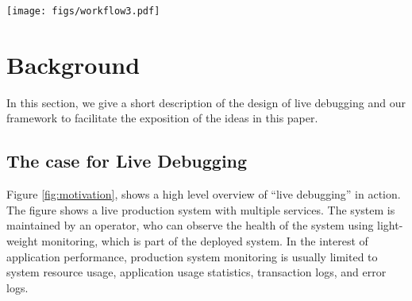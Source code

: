 
\begin{figure*}[ht!]
	\begin{center}
		\texttt{[image: figs/workflow3.pdf]}
		\caption{Workflow of \parikshan in a live multi-tier production system with several interacting services. When the administrator of the system observes errors in two of it's tiers, he can create a sandboxed clone of these tiers and observe/debug them in a sandbox environment without impacting the actual production system.}
		\label{fig:motivation}
	\end{center}
\end{figure*}



\section{Background}
\label{sec:background}

In this section, we give a short description of the design of live debugging and our \parikshan framework to facilitate the exposition of the ideas in this paper. 

\subsection{The case for Live Debugging}
\label{sec:case}

Figure \ref{fig:motivation}, shows a high level overview of ``live debugging'' in action. 
The figure shows a live production system with multiple services. 
The system is maintained by an operator, who can observe the health of the system using light-weight monitoring, which is part of the deployed system. 
In the interest of application performance, production system monitoring is usually limited to system resource usage, application usage statistics, transaction logs, and error logs.

